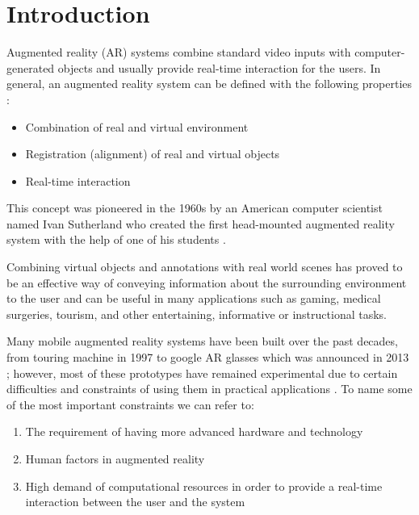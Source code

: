 \chapter{Introduction}
\label{chap:Introduction}

Augmented reality (AR) systems combine standard video inputs with computer-generated objects and
usually provide real-time interaction for the users. 
In general, an augmented reality system can be defined with the following properties \cite{azuma01} :
\begin{itemize}
\item Combination of real and virtual environment
\item Registration (alignment) of real and virtual objects
\item Real-time interaction
\end{itemize}
This concept was pioneered in the 1960s by an American computer scientist named Ivan Sutherland
who created the first head-mounted augmented reality
system with the help of one of his students \cite{azuma01}.

Combining virtual objects and annotations with real
world scenes has proved to be an effective way of conveying information about the surrounding environment to
the user and can be useful in many applications such as gaming, medical surgeries, tourism, and other entertaining, informative or instructional tasks.

Many mobile augmented reality systems have been built over the past decades, from touring machine in 1997 \cite{fei97} 
to google AR glasses which was announced in 2013 \cite{google}; however, most of these prototypes have remained experimental
due to certain difficulties and constraints of using them in practical applications \cite{dras96,liv05}. To name some of the most important constraints
we can refer to:
\begin{enumerate}
\item The requirement of having more advanced hardware and technology
\item Human factors in augmented reality 
\item High demand of computational resources in order to provide a real-time interaction between the user and the system
\end{enumerate}


